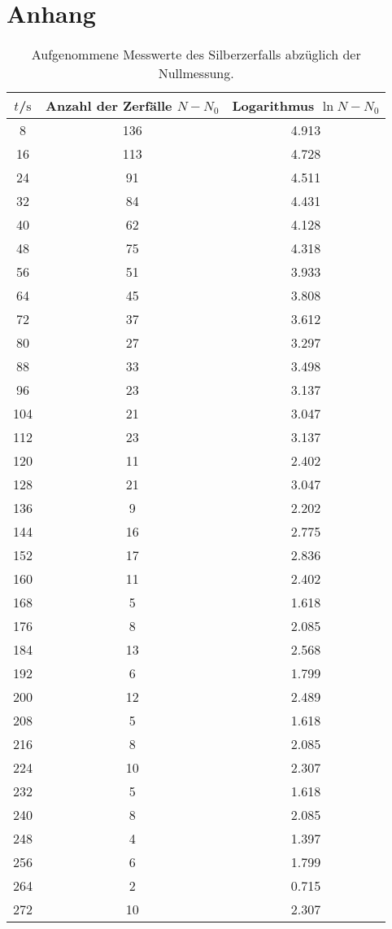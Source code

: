 \section{Anhang}




  \begin{longtable}{ccc}
  \caption{Aufgenommene Messwerte des Silberzerfalls abzüglich der Nullmessung.}\label{tab:anhang}\\
  \hline
$t$/$\si{\second}$ & Anzahl der Zerfälle $N-N_0$ & Logarithmus $\ln{N-N_0}$ \\
\hline
8 & 136 & 4.913 \\
16 & 113 & 4.728 \\
24 & 91 & 4.511 \\
32 & 84 & 4.431 \\
40 & 62 & 4.128 \\
48 & 75 & 4.318 \\
56 & 51 & 3.933 \\
64 & 45 & 3.808 \\
72 & 37 & 3.612 \\
80 & 27 & 3.297 \\
88 & 33 & 3.498 \\
96 & 23 & 3.137 \\
104 & 21 & 3.047 \\
112 & 23 & 3.137 \\
120 & 11 & 2.402 \\
128 & 21 & 3.047 \\
136 & 9 & 2.202 \\
144 & 16 & 2.775 \\
152 & 17 & 2.836 \\
160 & 11 & 2.402 \\
168 & 5 & 1.618 \\
176 & 8 & 2.085 \\
184 & 13 & 2.568 \\
192 & 6 & 1.799 \\
200 & 12 & 2.489 \\
208 & 5 & 1.618 \\
216 & 8 & 2.085 \\
224 & 10 & 2.307 \\
232 & 5 & 1.618 \\
240 & 8 & 2.085 \\
248 & 4 & 1.397 \\
256 & 6 & 1.799 \\
264 & 2 & 0.715 \\
272 & 10 & 2.307 \\

\end{longtable}
